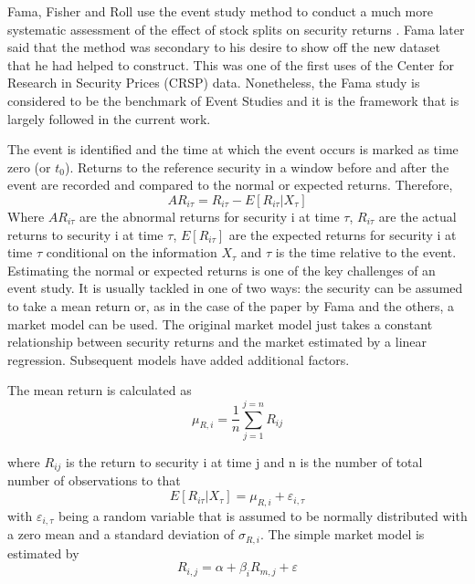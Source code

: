 \documentclass[12pt, a4paper, oneside]{article} %
\begin{document}
Fama, Fisher and Roll use the event study method to conduct a much more systematic assessment of the effect of stock splits on security returns \citep{FamaFisherJensenRoll}.    Fama later said that the method was secondary to his desire to show off the new dataset that he had helped to construct.  This was one of the first uses of the Center for Research in Security Prices (CRSP) data.  Nonetheless, the Fama study is considered to be the benchmark of Event Studies and it is the framework that is largely followed in the current work.  

The event is identified and the time at which the event occurs is marked as time zero (or $t_0$).  Returns to the reference security in a window before and after the event are recorded and compared to the normal or expected returns.  Therefore, 
\begin{equation}
AR_{i \tau} = R_{i \tau} - E[R_{i \tau} | X_{\tau}]
\end{equation}
Where $AR_{i \tau}$ are the abnormal returns for security i at time $\tau$, $R_{i \tau}$ are the actual returns to security i at time $\tau$,  $E[R_{i \tau}]$ are the expected returns for security i at time $\tau$ conditional on the information $X_{\tau}$ and $\tau$ is the time relative to the event.  Estimating the normal or expected returns is one of the key challenges of an event  study.  It is usually tackled in one of two ways:  the security can be assumed to take a mean return or, as in the case of the paper by Fama and the others, a market model can be used.  The original market model just takes a constant relationship between security returns and the market estimated by a linear regression.  Subsequent models have added additional factors.   

The mean return is calculated as 
\begin{equation}
\mu_{R, i} = \frac{1}{n}\sum_{j = 1}^{j = n} R_{i j}
\end{equation}

where $R_{i j}$ is the return to security i at time j and n is the number of total number of observations to that 
\begin{equation}
E[R_{i \tau} | X_{\tau}] = \mu_{R, i} + \varepsilon_{i, \tau}
\end{equation} 
with $\varepsilon_{i, \tau}$ being a random variable that is assumed to be normally distributed with a zero mean and a standard deviation of $\sigma_{R, i}$. 
The simple market model is estimated by 
\begin{equation}
R_{i, j} = \alpha + \beta_i R_{m, j} + \varepsilon
\end{equation}
\end{document}
